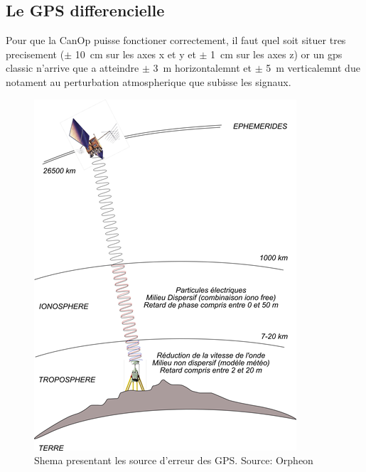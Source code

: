 \subsection{Le GPS differencielle}
\label{ssec:Gps_differenciel}
Pour que la CanOp puisse fonctioner correctement, il faut quel soit situer tres precisement ($\pm$ 10~cm sur les axes x et y et $\pm$ 1~cm sur les axes z) or un gps classic n'arrive que a atteindre $\pm$ 3~m horizontalemnt et $\pm$ 5~m verticalemnt due notament au perturbation atmospherique que subisse les signaux. 
\begin{figure}
    \centering
    \includegraphics{img/she/GPS-mode-Naturel-5-10m.png}
    \caption{Shema presentant les source d'erreur des GPS. Source: Orpheon}
    \label{fig:GPS_error_source}
\end{figure}

